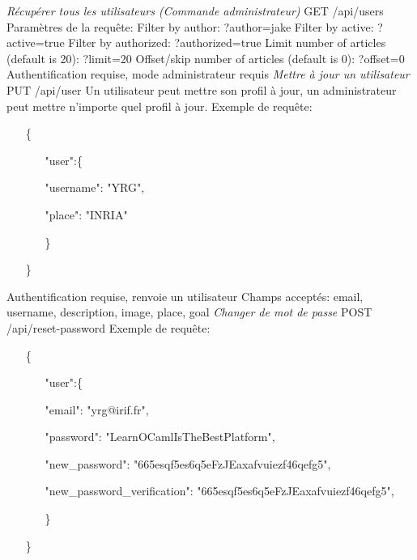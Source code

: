 \documentclass{article}
\begin{document}
\newline
\newline
\textit{Récupérer tous les utilisateurs (Commande administrateur)}
\newline
GET /api/users
\newline
Paramètres de la requête:
\newline
Filter by author:
\newline
?author=jake
\newline
Filter by active:
\newline
?active=true
\newline
Filter by authorized:
\newline
?authorized=true
\newline
Limit number of articles (default is 20):
\newline
?limit=20
\newline
Offset/skip number of articles (default is 0):
\newline
?offset=0
\newline
Authentification requise, mode administrateur requis
\newline
\newline
\textit{Mettre à jour un utilisateur}
\newline
PUT /api/user
\newline
Un utilisateur peut mettre son profil à jour, un administrateur peut mettre n'importe quel profil à jour.
\newline
Exemple de requête:
\begin{itemize}
	\item[\{]
	\begin{itemize}
		\item[]
		\item["user":\{]
		\item[]"username": "YRG",
		\item[]"place": "INRIA"
		\item[\}]
	\end{itemize}
	\item[\}]
\end{itemize}
Authentification requise, renvoie un utilisateur
\newline
Champs acceptés: email, username, description, image, place, goal
\newpage
\textit{Changer de mot de passe}
\newline
POST /api/reset-password
\newline
Exemple de requête:
\begin{itemize}
	\item[\{]
	\begin{itemize}
		\item[]
		\item["user":\{]
		\item[]"email": "yrg@irif.fr",
		\item[]"password": "LearnOCamlIsTheBestPlatform",
		\item[]"new\_password": "665esqf5es6q5eFzJEaxafvuiezf46qefg5",
		\item[]"new\_password\_verification": "665esqf5es6q5eFzJEaxafvuiezf46qefg5",
		\item[\}]
	\end{itemize}
	\item[\}]
\end{itemize}
\end{document}
